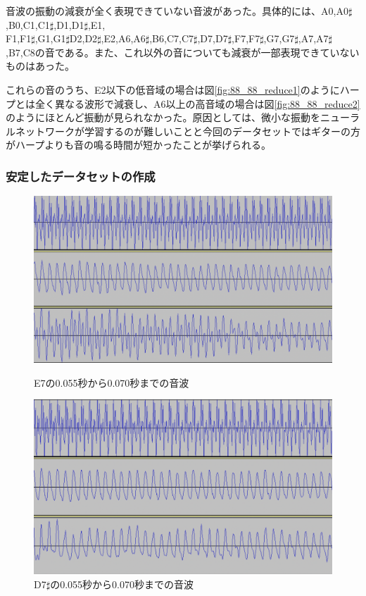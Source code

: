 音波の振動の減衰が全く表現できていない音波があった。具体的には、A0,A0$\sharp$,B0,C1,C1$\sharp$,D1,D1$\sharp$,E1,\\
F1,F1$\sharp$,G1,G1$\sharp$D2,D2$\sharp$,E2,A6,A6$\sharp$,B6,C7,C7$\sharp$,D7,D7$\sharp$,F7,F7$\sharp$,G7,G7$\sharp$,A7,A7$\sharp$,B7,C8の音である。また、これ以外の音についても減衰が一部表現できていないものはあった。

これらの音のうち、E2以下の低音域の場合は図\ref{fig:88_88_reduce1}のようにハープとは全く異なる波形で減衰し、A6以上の高音域の場合は図\ref{fig:88_88_reduce2}のようにほとんど振動が見られなかった。原因としては、微小な振動をニューラルネットワークが学習するのが難しいことと今回のデータセットではギターの方がハープよりも音の鳴る時間が短かったことが挙げられる。

\subsubsection{安定したデータセットの作成}

\begin{figure}[t]
\begin{center}
\begin{minipage}{0.48\hsize}
\begin{center}
\includegraphics[width=0.9\hsize]{figure/88_88_det/e7_0550_0700.png}
\caption{E7の0.055秒から0.070秒までの音波}
\label{fig:88_88_bad1}
\end{center}
\end{minipage}
\begin{minipage}{0.48\hsize}
\begin{center}
\includegraphics[width=0.9\hsize]{figure/88_88_det/d7s_0550_0700.png}
\caption{D7$\sharp$の0.055秒から0.070秒までの音波}
\label{fig:88_88_bad2}
\end{center}
\end{minipage}
\end{center}
\end{figure}

